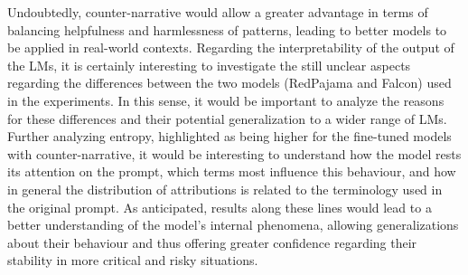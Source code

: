 Undoubtedly, counter-narrative would allow a greater advantage in terms of balancing helpfulness and harmlessness of patterns, leading to better models to be applied in real-world contexts. Regarding the interpretability of the output of the LMs, it is certainly interesting to investigate the still unclear aspects regarding the differences between the two models (RedPajama and Falcon) used in the experiments. In this sense, it would be important to analyze the reasons for these differences and their potential generalization to a wider range of LMs. Further analyzing entropy, highlighted as being higher for the fine-tuned models with counter-narrative, it would be interesting to understand how the model rests its attention on the prompt, which terms most influence this behaviour, and how in general the distribution of attributions is related to the terminology used in the original prompt. As anticipated, results along these lines would lead to a better understanding of the model's internal phenomena, allowing generalizations about their behaviour and thus offering greater confidence regarding their stability in more critical and risky situations.


